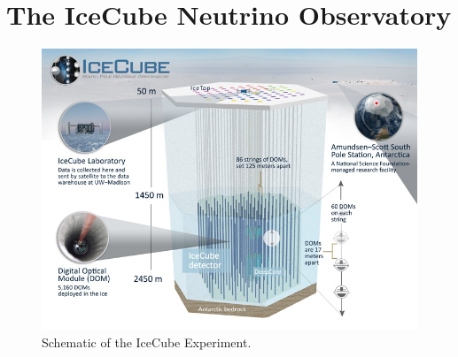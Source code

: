 \section{The IceCube Neutrino Observatory}\label{sec:detector}

\begin{figure}[tb]
  \centering
  \includegraphics[width=12cm,keepaspectratio]{icecube_detector_schematic.jpeg}
  \caption{Schematic of the IceCube Experiment\cite{IceCube}.}
  \label{fig:IceCube}
\end{figure}

